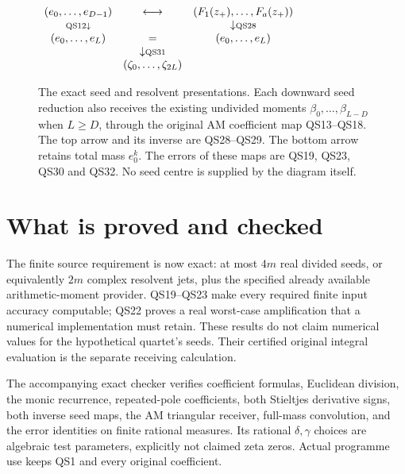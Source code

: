 \documentclass[11pt]{article}
\begin{document}
\begin{figure}[ht]\centering
\(\begin{array}{ccc}
 (e_0,\ldots,e_{D-1})&
 \longleftrightarrow&
 (F_1(z_+),\ldots,F_a(z_+))\\
 \scriptstyle{\rm QS12}\downarrow&&
 \downarrow\scriptstyle{\rm QS28}\\
 (e_0,\ldots,e_L)&=&(e_0,\ldots,e_L)\\
 &\downarrow\scriptstyle{\rm QS31}&\\
 &(\zeta_0,\ldots,\zeta_{2L})&
\end{array}\)
\caption{The exact seed and resolvent presentations.
Each downward seed reduction also receives the existing
undivided moments \(\beta_0,\ldots,\beta_{L-D}\) when
\(L\ge D\), through the original AM coefficient map
QS13--QS18. The top arrow and its inverse are QS28--QS29.
The bottom arrow retains total mass \(e_0^k\).
The errors of these maps are QS19, QS23, QS30 and QS32.
No seed centre is supplied by the diagram itself.}
\end{figure}

\section{What is proved and checked}

The finite source requirement is now exact: at most \(4m\)
real divided seeds, or equivalently \(2m\) complex resolvent
jets, plus the specified already available arithmetic-moment
provider. QS19--QS23 make every required finite input accuracy
computable; QS22 proves a real worst-case amplification that
a numerical implementation must retain. These results do not
claim numerical values for the hypothetical quartet's seeds.
Their certified original integral evaluation is the separate
receiving calculation.

The accompanying exact checker verifies coefficient formulas,
Euclidean division, the monic recurrence, repeated-pole
coefficients, both Stieltjes derivative signs, both inverse
seed maps, the AM triangular receiver, full-mass convolution,
and the error identities on finite rational measures.
Its rational \(\delta,\gamma\) choices are algebraic test
parameters, explicitly not claimed zeta zeros. Actual programme
use keeps QS1 and every original coefficient.
\end{document}
